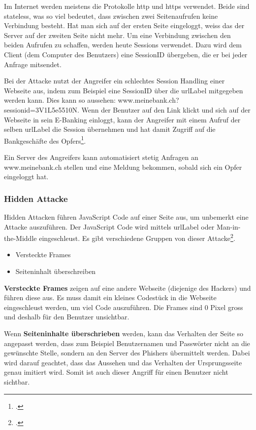 Im Internet werden meistens die Protokolle http und https verwendet. Beide sind stateless, was so viel bedeutet, dass zwischen zwei Seitenaufrufen keine Verbindung besteht. Hat man sich auf der ersten Seite eingeloggt, weiss das der Server auf der zweiten Seite nicht mehr. Um eine Verbindung zwischen den beiden Aufrufen zu schaffen, werden heute Sessions verwendet. Dazu wird dem Client (dem Computer des Benutzers) eine SessionID übergeben, die er bei jeder Anfrage mitsendet.

Bei der Attacke nutzt der Angreifer ein schlechtes Session Handling einer Webseite aus, indem zum Beispiel eine SessionID über die \Gls{urlLabel} mitgegeben werden kann. Dies kann so aussehen: www.meinebank.ch?sessionid=3V1L5e5510N. Wenn der Benutzer auf den Link klickt und sich auf der Webseite in sein E-Banking einloggt, kann der Angreifer mit einem Aufruf der selben \Gls{urlLabel} die Session übernehmen und hat damit Zugriff auf die Bankgeschäfte des Opfers\footcite{NISR-WP-Phishingv101doc_2015-06-29}.

Ein Server des Angreifers kann automatisiert stetig Anfragen an www.meinebank.ch stellen und eine Meldung bekommen, sobald sich ein Opfer eingeloggt hat.

\subsubsection{Hidden Attacke}
Hidden Attacken führen JavaScript Code auf einer Seite aus, um unbemerkt eine Attacke auszuführen. Der JavaScript Code wird mittels \Gls{urlLabel} oder Man-in-the-Middle eingeschleust. Es gibt verschiedene Gruppen von dieser Attacke\footcite{NISR-WP-Phishingv101doc_2015-06-29}.
\begin{itemize}
\item Versteckte Frames
\item Seiteninhalt überschreiben
\end{itemize}
\textbf{Versteckte Frames} zeigen auf eine andere Webseite (diejenige des Hackers) und führen diese aus. Es muss damit ein kleines Codestück in die Webseite eingeschleust werden, um viel Code auszuführen. Die Frames sind 0 Pixel gross und deshalb für den Benutzer unsichtbar.

Wenn \textbf{Seiteninhalte überschrieben} werden, kann das Verhalten der Seite so angepasst werden, dass zum Beispiel Benutzernamen und Passwörter nicht an die gewünschte Stelle, sondern an den Server des Phishers übermittelt werden. Dabei wird darauf geachtet, dass das Aussehen und das Verhalten der Ursprungsseite genau imitiert wird. Somit ist auch dieser Angriff für einen Benutzer nicht sichtbar.

